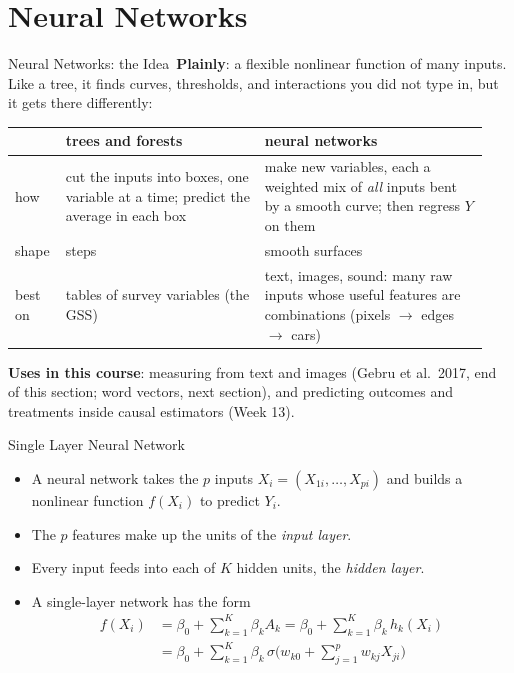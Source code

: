 \documentclass[aspectratio=169,11pt,xcolor=dvipsnames]{beamer}
\newcommand{\core}{\,\raisebox{0.6pt}{\textcolor{corestar}{$\bigstar$}}}
\begin{document}
\section[Neural Nets]{Neural Networks}
\begin{frame}\sectionpage\end{frame}

\begin{frame}{Neural Networks: the Idea\core}
\textbf{Plainly}: a flexible nonlinear function of many inputs. Like a tree, it finds curves,
thresholds, and interactions you did not type in, but it gets there differently:
\vskip2pt
\begin{center}\footnotesize
\renewcommand{\arraystretch}{1.2}
\begin{tabular}{@{}>{\raggedright\arraybackslash}p{0.09\linewidth}>{\raggedright\arraybackslash}p{0.4\linewidth}>{\raggedright\arraybackslash}p{0.45\linewidth}@{}}
\toprule
& trees and forests & neural networks \\
\midrule
how & cut the inputs into boxes, one variable at a time; predict the average in each box &
      make new variables, each a weighted mix of \emph{all} inputs bent by a smooth curve; then
      regress $Y$ on them \\
shape & steps & smooth surfaces \\
best on & tables of survey variables (the GSS) & text, images, sound: many raw inputs whose useful
      features are combinations (pixels $\to$ edges $\to$ cars) \\
\bottomrule
\end{tabular}
\end{center}
\vskip2pt
{\small\textbf{Uses in this course}: measuring from text and images (Gebru et al.\ 2017, end of this section;
word vectors, next section), and predicting outcomes and treatments inside causal estimators (Week 13).}
\end{frame}

\begin{frame}{Single Layer Neural Network\core}
\begin{itemize}\itemsep4pt
  \item A neural network takes the $p$ inputs $X_i = (X_{1i}, \dots, X_{pi})$ and
        builds a nonlinear function $f(X_i)$ to predict $Y_i$.
  \item The $p$ features make up the units of the \textit{input layer}.
  \item Every input feeds into each of $K$ hidden units, the \textit{hidden layer}.
  \item A single-layer network has the form
  \begin{align*}
    f(X_i) &= \beta_0 + \sum_{k=1}^K \beta_k A_k = \beta_0 + \sum_{k=1}^K \beta_k\,h_k(X_i) \\
           &= \beta_0 + \sum_{k=1}^K \beta_k\,\sigma\Big(w_{k0} + \sum_{j=1}^p w_{kj}X_{ji}\Big)
  \end{align*}
\end{itemize}
\end{frame}
\end{document}
